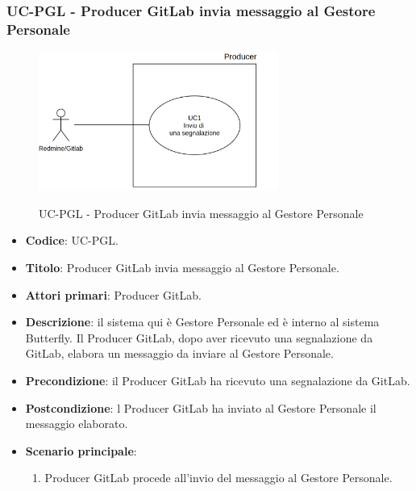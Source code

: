 \subsubsection{UC\theuccount-PGL - Producer GitLab invia messaggio al Gestore Personale}
	\begin{figure}[H]
		\centering
		\includegraphics[width=0.7\textwidth]{img/UC1.png}\\
		\caption{UC\theuccount-PGL - Producer GitLab invia messaggio al Gestore Personale}
	\end{figure}
	\begin{itemize}
		\item \textbf{Codice}: UC\theuccount-PGL.
		\item \textbf{Titolo}: Producer GitLab invia messaggio al Gestore Personale.
		\item \textbf{Attori primari}: Producer GitLab.
		\item \textbf{Descrizione}: il sistema qui è Gestore Personale ed è interno al sistema Butterfly. Il Producer GitLab,
		dopo aver ricevuto una segnalazione da GitLab, elabora un messaggio da inviare al Gestore Personale.
		\item \textbf{Precondizione}: il Producer GitLab ha ricevuto una segnalazione da GitLab.
		\item \textbf{Postcondizione}: l Producer GitLab ha inviato al Gestore Personale il messaggio elaborato.
		\item \textbf{Scenario principale}: 
		\begin{enumerate}
			\item Producer GitLab procede all'invio del messaggio al Gestore Personale.
		\end{enumerate}
		
	\end{itemize}
	
